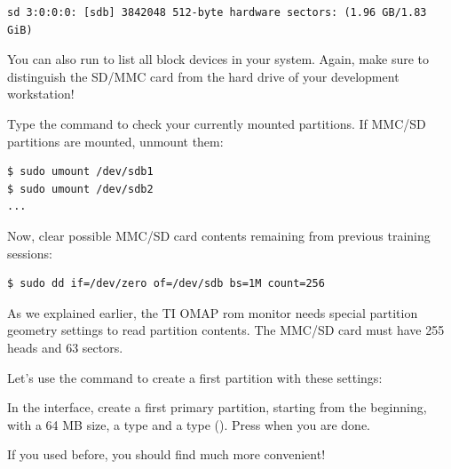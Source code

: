 \begin{verbatim}
sd 3:0:0:0: [sdb] 3842048 512-byte hardware sectors: (1.96 GB/1.83 GiB)
\end{verbatim}


You can also run  to list all block devices
in your system. Again, make sure to distinguish the SD/MMC card from the
hard drive of your development workstation!

Type the  command to check your currently mounted
partitions. If MMC/SD partitions are mounted, unmount them:

\begin{verbatim}
$ sudo umount /dev/sdb1
$ sudo umount /dev/sdb2
...
\end{verbatim}

Now, clear possible MMC/SD card contents remaining from previous training 
sessions:

\begin{verbatim}
$ sudo dd if=/dev/zero of=/dev/sdb bs=1M count=256
\end{verbatim}

As we explained earlier, the TI OMAP rom monitor needs special partition geometry settings
to read partition contents. The MMC/SD card must have 255 heads and 63 sectors.

Let's use the  command to create a first partition with these settings:


In the  interface, create a first primary partition, starting from the beginning,
with a 64 MB size, a  type and a  type ().
Press  when you are done.

If you used  before, you should find  much more convenient!

